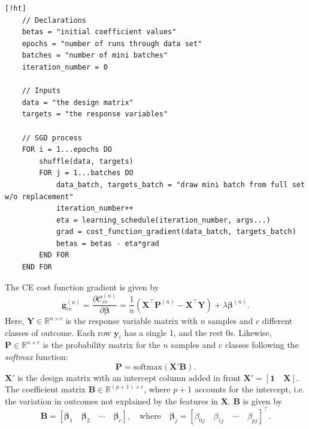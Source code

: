 \documentclass[]{article}
\begin{document}
\begin{lstlisting}[caption={Stochastic Gradient Descent algorithm. Cost function gradients and learning schedules may be defined independently of the implementation of SGD. This implementation runs for \lstinline|epochs*batches| iterations, and does not sense if or when it converges.},label={lst:sgd}] [!ht]
	// Declarations
	betas = "initial coefficient values"
	epochs = "number of runs through data set"
	batches = "number of mini batches"
	iteration_number = 0
	
	// Inputs
	data = "the design matrix"
	targets = "the response variables"
	
	// SGD process	
	FOR i = 1...epochs DO
		shuffle(data, targets)
		FOR j = 1...batches DO
			data_batch, targets_batch = "draw mini batch from full set w/o replacement"
			iteration_number++
			eta = learning_schedule(iteration_number, args...)
			grad = cost_function_gradient(data_batch, targets_batch)
			betas = betas - eta*grad
		END FOR
	END FOR
\end{lstlisting}

The CE cost function gradient is given by
\begin{equation} \label{cost-ce}
	\mathbf{g}_{ce}^{(n)} = \frac{\partial \mathcal{C}_{ce}^{(n)}}{\partial \mathbf{\beta}} = \frac{1}{n} (\mathbf{X}^\intercal \mathbf{P}^{(n)} - \mathbf{X}^\intercal \mathbf{Y}) + \lambda \mathbf{\beta}^{(n)}.
\end{equation}
Here, $\mathbf{Y} \in \mathbb{R}^{n \times c}$ is the response variable matrix with $n$ samples and $c$ different classes of outcome. Each row $\mathbf{y}_i$ has a single 1, and the rest 0s. Likewise, $\mathbf{P} \in \mathbb{R}^{n \times c}$ is the probability matrix for the $n$ samples and $c$ classes following the \textit{softmax} function:
\begin{equation}
	\mathbf{P} = \mathrm{softmax}(\mathbf{X}'\mathbf{B}).
\end{equation}
$\mathbf{X}'$ is the design matrix with an intercept column added in front $\mathbf{X}' = [\mathbf{1} \quad \mathbf{X}]$. The coefficient matrix $\mathbf{B} \in \mathbb{R}^{(p+1) \times c}$, where $p + 1$ accounts for the intercept, i.e. the variation in outcomes not explained by the features in $\mathbf{X}$. $\mathbf{B}$ is given by
\begin{equation}
	\mathbf{B} = [\mathbf{\beta}_1 \quad \mathbf{\beta}_2 \quad \cdots \quad \mathbf{\beta}_c], \quad \text{where} \quad \mathbf{\beta}_j = [\beta_{0j} \quad \beta_{1j} \quad \cdots \quad \beta_{pj}]^\intercal.
\end{equation}
\end{document}
